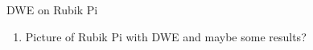 




\begin{frame}{DWE on Rubik Pi}
     \begin{enumerate}
        \item Picture of Rubik Pi with DWE and maybe some results?
    \end{enumerate}
\end{frame}

